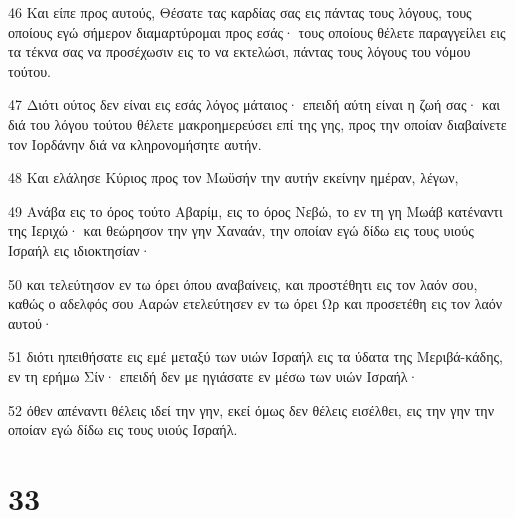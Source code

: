 \par 46 Και είπε προς αυτούς, Θέσατε τας καρδίας σας εις πάντας τους λόγους, τους οποίους εγώ σήμερον διαμαρτύρομαι προς εσάς· τους οποίους θέλετε παραγγείλει εις τα τέκνα σας να προσέχωσιν εις το να εκτελώσι, πάντας τους λόγους του νόμου τούτου.
\par 47 Διότι ούτος δεν είναι εις εσάς λόγος μάταιος· επειδή αύτη είναι η ζωή σας· και διά του λόγου τούτου θέλετε μακροημερεύσει επί της γης, προς την οποίαν διαβαίνετε τον Ιορδάνην διά να κληρονομήσητε αυτήν.
\par 48 Και ελάλησε Κύριος προς τον Μωϋσήν την αυτήν εκείνην ημέραν, λέγων,
\par 49 Ανάβα εις το όρος τούτο Αβαρίμ, εις το όρος Νεβώ, το εν τη γη Μωάβ κατέναντι της Ιεριχώ· και θεώρησον την γην Χαναάν, την οποίαν εγώ δίδω εις τους υιούς Ισραήλ εις ιδιοκτησίαν·
\par 50 και τελεύτησον εν τω όρει όπου αναβαίνεις, και προστέθητι εις τον λαόν σου, καθώς ο αδελφός σου Ααρών ετελεύτησεν εν τω όρει Ωρ και προσετέθη εις τον λαόν αυτού·
\par 51 διότι ηπειθήσατε εις εμέ μεταξύ των υιών Ισραήλ εις τα ύδατα της Μεριβά-κάδης, εν τη ερήμω Σίν· επειδή δεν με ηγιάσατε εν μέσω των υιών Ισραήλ·
\par 52 όθεν απέναντι θέλεις ιδεί την γην, εκεί όμως δεν θέλεις εισέλθει, εις την γην την οποίαν εγώ δίδω εις τους υιούς Ισραήλ.

\chapter{33}

